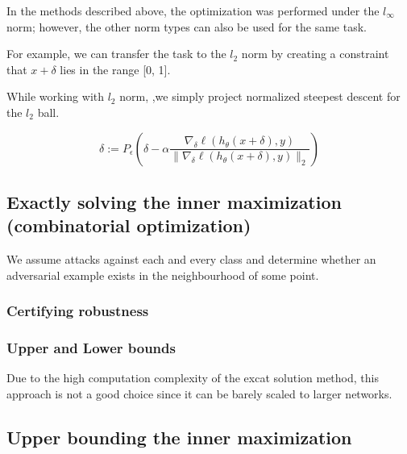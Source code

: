 In the methods described above, the optimization was performed under the $l_{\infty}$ norm; however, 
the other norm types can also be used for the same task.

For example, we can transfer the task to the $l_2$ norm by creating a constraint that $x+\delta$ lies in the range [0, 1].

While working with $l_2$ norm, ,we simply project normalized steepest descent for the $l_2$ ball. 

\[\delta := P_{\epsilon}\left(\delta - \alpha \frac{\nabla_{\delta} \ell(h_{\theta}(x + \delta), y)}{\|\nabla_{\delta} \ell(h_{\theta}(x + \delta), y)\|_2}\right)\]


\subsection{Exactly solving the inner maximization (combinatorial optimization)}

We assume attacks against each and every class and determine whether an adversarial example exists in the neighbourhood of some point.

\subsubsection{Certifying robustness}




\subsubsection{Upper and Lower bounds}

Due to the high computation complexity of the excat solution method, this approach is not a good choice since it can be barely scaled to larger networks. 

\subsection{Upper bounding the inner maximization}



